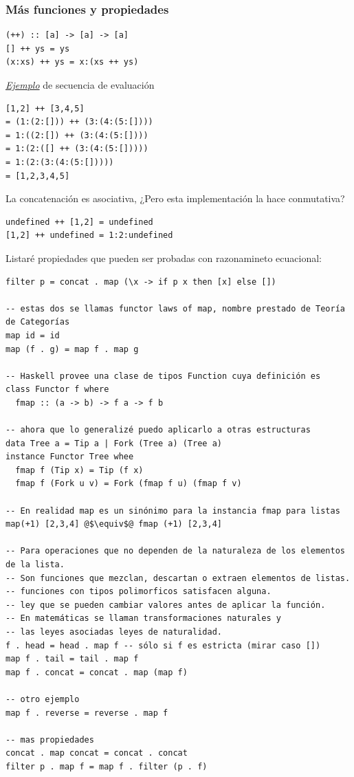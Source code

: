 \documentclass[12pt]{extarticle}
\def\ejemplo{\textit{\underline{Ejemplo} }}
\begin{document}
\subsubsection{Más funciones y propiedades}
\begin{verbatim}
(++) :: [a] -> [a] -> [a]
[] ++ ys = ys
(x:xs) ++ ys = x:(xs ++ ys)
\end{verbatim}

\ejemplo de secuencia de evaluación

\begin{verbatim}
[1,2] ++ [3,4,5]
= (1:(2:[])) ++ (3:(4:(5:[])))
= 1:((2:[]) ++ (3:(4:(5:[])))
= 1:(2:([] ++ (3:(4:(5:[]))))
= 1:(2:(3:(4:(5:[]))))
= [1,2,3,4,5]
\end{verbatim}

La concatenación es asociativa, ¿Pero esta implementación la hace conmutativa?
\begin{verbatim}
undefined ++ [1,2] = undefined
[1,2] ++ undefined = 1:2:undefined
\end{verbatim}

Listaré propiedades que pueden ser probadas con razonamineto ecuacional:
\begin{verbatim}
filter p = concat . map (\x -> if p x then [x] else [])

-- estas dos se llamas functor laws of map, nombre prestado de Teoría de Categorías
map id = id
map (f . g) = map f . map g

-- Haskell provee una clase de tipos Function cuya definición es
class Functor f where
  fmap :: (a -> b) -> f a -> f b

-- ahora que lo generalizé puedo aplicarlo a otras estructuras
data Tree a = Tip a | Fork (Tree a) (Tree a)
instance Functor Tree whee
  fmap f (Tip x) = Tip (f x)
  fmap f (Fork u v) = Fork (fmap f u) (fmap f v)

-- En realidad map es un sinónimo para la instancia fmap para listas
map(+1) [2,3,4] @$\equiv$@ fmap (+1) [2,3,4]

-- Para operaciones que no dependen de la naturaleza de los elementos de la lista.
-- Son funciones que mezclan, descartan o extraen elementos de listas.
-- funciones con tipos polimorficos satisfacen alguna.
-- ley que se pueden cambiar valores antes de aplicar la función.
-- En matemáticas se llaman transformaciones naturales y 
-- las leyes asociadas leyes de naturalidad.
f . head = head . map f -- sólo si f es estricta (mirar caso [])
map f . tail = tail . map f
map f . concat = concat . map (map f)

-- otro ejemplo
map f . reverse = reverse . map f

-- mas propiedades
concat . map concat = concat . concat
filter p . map f = map f . filter (p . f)
\end{verbatim}
\end{document}
